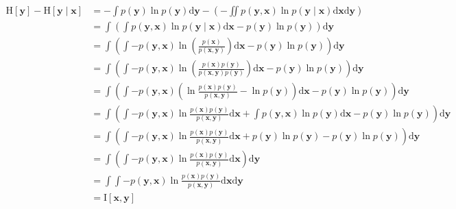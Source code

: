 \documentclass{article}
\begin{document}
 $$\begin{aligned}\mathrm{H}[\mathbf{y}]-\mathrm{H}[\mathbf{y} \mid \mathbf{x}]&=-\int p(\mathbf{y}) \ln p(\mathbf{y}) \mathrm{d} \mathbf{y} -\left(-\iint p(\mathbf{y}, \mathbf{x}) \ln p(\mathbf{y} \mid \mathbf{x}) \mathrm{d} \mathbf{x} \mathrm{d} \mathbf{y}\right)\\&=\int\left(\int p(\mathbf{y}, \mathbf{x}) \ln p(\mathbf{y} \mid \mathbf{x}) \mathrm{d} \mathbf{x}- p(\mathbf{y}) \ln p(\mathbf{y}) \right) \mathrm{d} \mathbf{y}\\&=\int\left(\int -p(\mathbf{y}, \mathbf{x}) \ln\left(\frac{p(\mathbf{x})}{p(\mathbf{x},\mathbf{y})}\right)\mathrm{d} \mathbf{x}- p(\mathbf{y}) \ln p(\mathbf{y}) \right) \mathrm{d} \mathbf{y}\\&=\int\left(\int -p(\mathbf{y}, \mathbf{x}) \ln\left(\frac{p(\mathbf{x})p(\mathbf{y})}{p(\mathbf{x},\mathbf{y})p(\mathbf{y})}\right)\mathrm{d} \mathbf{x}- p(\mathbf{y}) \ln p(\mathbf{y}) \right) \mathrm{d} \mathbf{y}\\&=\int\left(\int -p(\mathbf{y}, \mathbf{x}) \left(\ln\frac{p(\mathbf{x})p(\mathbf{y})}{p(\mathbf{x},\mathbf{y})}-\ln p(\mathbf{y})\right)\mathrm{d} \mathbf{x}- p(\mathbf{y}) \ln p(\mathbf{y}) \right) \mathrm{d} \mathbf{y}\\&=\int\left(\int -p(\mathbf{y}, \mathbf{x}) \ln\frac{p(\mathbf{x})p(\mathbf{y})}{p(\mathbf{x},\mathbf{y})}\mathrm{d} \mathbf{x}+\int p(\mathbf{y}, \mathbf{x}) \ln p(\mathbf{y})\mathrm{d} \mathbf{x}- p(\mathbf{y}) \ln p(\mathbf{y}) \right) \mathrm{d} \mathbf{y}\\&=\int\left(\int -p(\mathbf{y}, \mathbf{x}) \ln\frac{p(\mathbf{x})p(\mathbf{y})}{p(\mathbf{x},\mathbf{y})}\mathrm{d} \mathbf{x}+p(\mathbf{y}) \ln p(\mathbf{y})- p(\mathbf{y}) \ln p(\mathbf{y}) \right) \mathrm{d} \mathbf{y}\\&=\int\left(\int -p(\mathbf{y}, \mathbf{x}) \ln\frac{p(\mathbf{x})p(\mathbf{y})}{p(\mathbf{x},\mathbf{y})}\mathrm{d} \mathbf{x}\right) \mathrm{d} \mathbf{y}\\&=\int\int -p(\mathbf{y}, \mathbf{x}) \ln\frac{p(\mathbf{x})p(\mathbf{y})}{p(\mathbf{x},\mathbf{y})}\mathrm{d} \mathbf{x}\mathrm{d} \mathbf{y} \\ &=\mathrm{I}[\mathbf{x}, \mathbf{y}]\end{aligned}$$
 
\end{document}
